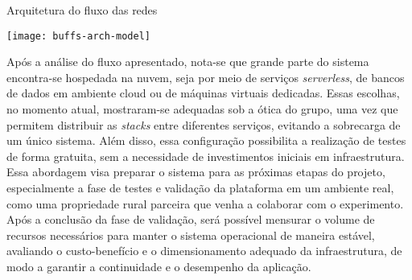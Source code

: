 \begin{flowchart}[!htb]
\centering
\caption{Arquitetura do fluxo das redes}%
\label{fcht:fluxograma}
\texttt{[image: buffs-arch-model]}
\end{flowchart}

\newpage
Após a análise do fluxo apresentado, nota-se que grande parte do sistema encontra-se hospedada na nuvem, seja por meio de serviços \textit{serverless}, de bancos de dados em ambiente cloud ou de máquinas virtuais dedicadas. Essas escolhas, no momento atual, mostraram-se adequadas sob a ótica do grupo, uma vez que permitem distribuir as \textit{stacks} entre diferentes serviços, evitando a sobrecarga de um único sistema. Além disso, essa configuração possibilita a realização de testes de forma gratuita, sem a necessidade de investimentos iniciais em infraestrutura. Essa abordagem visa preparar o sistema para as próximas etapas do projeto, especialmente a fase de testes e validação da plataforma em um ambiente real, como uma propriedade rural parceira que venha a colaborar com o experimento. Após a conclusão da fase de validação, será possível mensurar o volume de recursos necessários para manter o sistema operacional de maneira estável, avaliando o custo-benefício e o dimensionamento adequado da infraestrutura, de modo a garantir a continuidade e o desempenho da aplicação.


